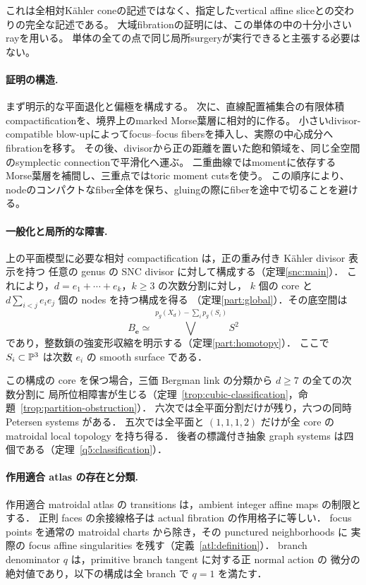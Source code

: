 これは全相対Kähler coneの記述ではなく、指定したvertical affine sliceとの交わりの完全な記述である。
大域fibrationの証明には、この単体の中の十分小さいrayを用いる。
単体の全ての点で同じ局所surgeryが実行できると主張する必要はない。

\paragraph{証明の構造.}
まず明示的な平面退化と偏極を構成する。
次に、直線配置補集合の有限体積compactificationを、境界上のmarked Morse葉層に相対的に作る。
小さいdivisor-compatible blow-upによってfocus--focus fibersを挿入し、実際の中心成分へfibrationを移す。
その後、divisorから正の距離を置いた飽和領域を、同じ全空間のsymplectic connectionで平滑化へ運ぶ。
二重曲線ではmomentに依存するMorse葉層を補間し、三重点ではtoric moment cutsを使う。
この順序により、nodeのコンパクトなfiber全体を保ち、gluingの際にfiberを途中で切ることを避ける。

\paragraph{一般化と局所的な障害.}
上の平面模型に必要な相対 compactification は，正の重み付き Kähler divisor 表示を持つ
任意の genus の SNC divisor に対して構成する（定理\ref{snc:main}）．
これにより，$d=e_1+\cdots+e_k$，$k\geq3$ の次数分割に対し，
$k$ 個の core と $d\sum_{i<j}e_i e_j$ 個の nodes を持つ構成を得る
（定理\ref{part:global}）．その底空間は
\[
 B_{\boldsymbol e}\simeq
 \bigvee^{\,p_g(X_d)-\sum_i p_g(S_i)}S^2
\]
であり，整数鎖の強変形収縮を明示する（定理\ref{part:homotopy}）．
ここで $S_i\subset\mathbb P^3$ は次数 $e_i$ の smooth surface である．

この構成の core を保つ場合，三価 Bergman link の分類から $d\geq7$ の全ての次数分割に
局所位相障害が生じる（定理~\ref{trop:cubic-classification}，命題~\ref{trop:partition-obstruction}）．
六次では全平面分割だけが残り，六つの同時 Petersen systems がある．
五次では全平面と $(1,1,1,2)$ だけが全 core の matroidal local topology を持ち得る．
後者の標識付き抽象 graph systems は四個である（定理~\ref{q5:classification}）．

\paragraph{作用適合 atlas の存在と分類.}
作用適合 matroidal atlas の transitions は，ambient integer affine maps の制限とする．
正則 faces の余接線格子は actual fibration の作用格子に等しい．
focus points を通常の matroidal charts から除き，その punctured neighborhoods に
実際の focus affine singularities を残す（定義~\ref{atl:definition}）．
branch denominator $q$ は，primitive branch tangent に対する正 normal action の
微分の絶対値であり，以下の構成は全 branch で $q=1$ を満たす．


